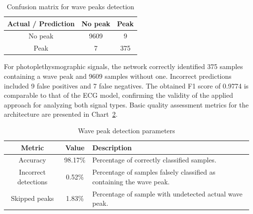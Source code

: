 \documentclass{citask}
\begin{document}
\begin{table}[ht]
\centering
\caption{Confusion matrix for wave peaks detection}
\label{tab:conf_matrix_ppg}
\begin{tabular}{|c|c|c|}
\hline
\textbf{Actual / Prediction} & \textbf{No peak } & \textbf{Peak} \\
\hline
No peak  & 9609 & 9 \\

Peak  & 7 & 375 \\
\hline
\end{tabular}
\end{table}

For photoplethysmographic signals, the network correctly identified 375 samples containing a wave peak and 9609 samples without one. Incorrect predictions included 9 false positives and 7 false negatives. The obtained F1 score of 0.9774 is comparable to that of the ECG model, confirming the validity of the applied approach for analyzing both signal types. Basic quality assessment metrics for the architecture are presented in Chart~\ref{tab:metrics_ppg}.

\begin{table}[ht]
\centering
\caption{Wave peak detection parameters}
\label{tab:metrics_ppg}
\begin{tabular}{|c|c|p{4.6cm}|}
\hline
\textbf{Metric} & \textbf{Value} & \textbf{Description} \\
\hline
Accuracy & 98.17\% & Percentage of correctly classified samples. \\
Incorrect detections & 0.52\% & Percentage of samples falsely classified as containing the wave peak. \\
Skipped peaks & 1.83\% & Percentage of sample with undetected actual wave peak. \\
\hline
\end{tabular}
\end{table}
\end{document}
